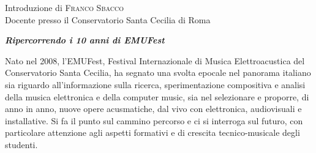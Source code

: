 \begin{flushright}
\bigskip

Introduzione di \textsc{Franco Sbacco}\\
{\footnotesize Docente presso il Conservatorio Santa Cecilia di Roma}


\bigskip

\textbf{\emph{Ripercorrendo i 10 anni di EMUFest}}

\medskip

Nato nel 2008, l’EMUFest, Festival Internazionale di Musica Elettroacustica del Conservatorio Santa Cecilia, ha segnato una svolta epocale nel panorama italiano sia riguardo all’informazione sulla ricerca, sperimentazione compositiva e analisi della musica elettronica e della computer music, sia nel selezionare e proporre, di anno in anno, nuove opere acusmatiche, dal vivo con elettronica, audiovisuali e installative. Si fa il punto sul cammino percorso e ci si interroga sul futuro, con particolare attenzione agli aspetti formativi e di crescita tecnico-musicale degli studenti.

\end{flushright}

\vfill

